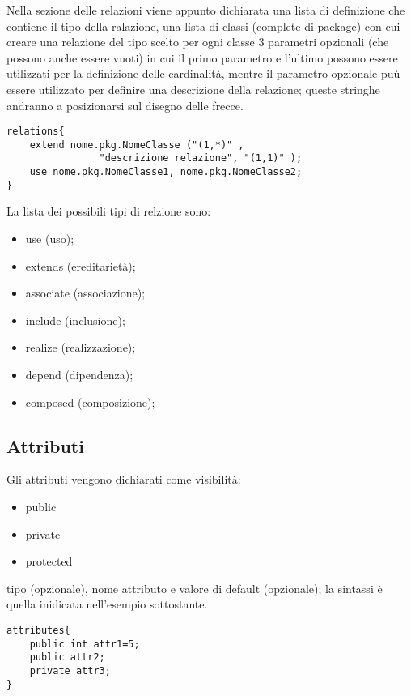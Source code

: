 Nella sezione delle relazioni
viene appunto dichiarata una lista di definizione che contiene il tipo della 
ralazione, una lista di classi (complete di package) 
con cui creare una relazione del tipo scelto
per ogni classe 3 parametri opzionali (che possono anche essere vuoti) in cui
il primo parametro e l'ultimo possono essere utilizzati per la definizione delle
cardinalità, mentre il parametro opzionale puù essere utilizzato per definire
una descrizione della relazione; queste stringhe andranno a posizionarsi sul 
disegno delle frecce.

\begin{lstlisting}[caption={Dichiarazione di relazione}, style={model}]
relations{
	extend nome.pkg.NomeClasse ("(1,*)" , 
				"descrizione relazione", "(1,1)" );
	use nome.pkg.NomeClasse1, nome.pkg.NomeClasse2;
}
\end{lstlisting}

La lista dei possibili tipi di relzione sono:
\begin{itemize}
  \item{use (uso);}
  \item{extends (ereditarietà);}
  \item{associate (associazione);}
  \item{include (inclusione);}
  \item{realize (realizzazione);}
  \item{depend (dipendenza);}
  \item{composed (composizione);}
\end{itemize}

\subsection{Attributi}

Gli attributi vengono dichiarati come visibilità:
\begin{itemize}
  \item public
  \item private
  \item protected
\end{itemize}

tipo (opzionale), nome attributo e valore di default (opzionale); la sintassi è
quella inidicata nell'esempio sottostante.

\begin{lstlisting}[caption={Dichiarazione di attributi}, style={model}]
attributes{
	public int attr1=5;
	public attr2;
	private attr3;
}
\end{lstlisting}

